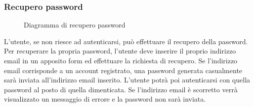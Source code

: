 \documentclass[a4paper, titlepage]{article}
\begin{document}
\newpage
\subsubsection{Recupero password}
\begin{figure}[H]
	\centering
	\noindent{}
	\caption{Diagramma di recupero password}
\end{figure}
L’utente, se non riesce ad autenticarsi, può effettuare il recupero della password. Per recuperare la propria password, l’utente deve inserire il proprio indirizzo email in un apposito form ed effettuare la richiesta di recupero. 
Se l’indirizzo email corrisponde a un account registrato, una password generata casualmente sarà inviata all’indirizzo email inserito. L’utente potrà poi autenticarsi con quella password al posto di quella dimenticata. Se l’indirizzo email è scorretto verrà visualizzato un messaggio di errore e la password non sarà inviata.

\newpage
\end{document}
